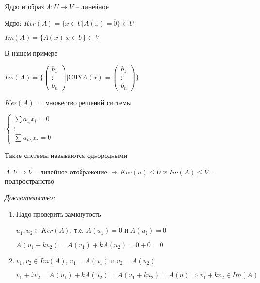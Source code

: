 \documentclass[12pt]{article}
\begin{document}
\begin{defin}{Ядро и образ}
    $A : U \rightarrow V$ -- линейное

    Ядро: $Ker(A) = \{x \in U | A(x) = \overline{0} \} \subset U$

    $Im(A) = \{ A(x) | x \in U \} \subset V$

    \begin{Example}{}
        В нашем примере

        $Im(A) = \{ \left( \begin{gathered}
            b_1 \\
            \vdots \\
            b_n
        \end{gathered} \right) | \text{СЛУ} A(x) = \left( \begin{gathered}
            b_1 \\
            \vdots \\
            b_n
        \end{gathered} \right) \}$

        $Ker(A) = $ множество решений системы

        $\begin{cases}
            \sum a_{1_i}x_i = 0 \\
            \vdots \\
            \sum a_{m_i}x_i = 0
        \end{cases}$

        Такие системы называются однородными
    \end{Example}
\end{defin}

\begin{lem}{}
    $A : U \rightarrow V$ -- линейное отображение $\Rightarrow Ker(a) \leq U$ и $Im(A) \leq V$ -- подпространство
\end{lem}

\textit{Доказательство:}

\begin{enumerate}
    \item Надо проверить замкнутость

    $u_1, u_2 \in Ker(A)$, т.е. $A(u_1) = 0$ и $A(u_2) = 0$
    
    $A(u_1 + ku_2) = A(u_1) + kA(u_2) = 0 + 0 = 0$

    \item $v_1, v_2 \in Im(A)$, $v_1 = A(u_1)$ и $v_2 = A(u_2)$
    
    $v_1 + kv_2 = A(u_1) + kA(u_2) = A(u_1 + ku_2) = A(u) \Rightarrow v_1 + kv_2 \in Im(A)$
\end{enumerate}
\end{document}
